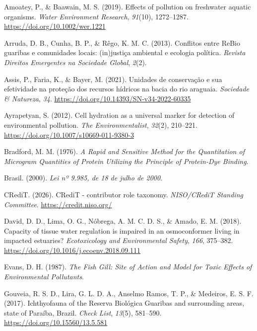 \documentclass[
  american,
  letterpaper,
  DIV=11,
  numbers=noendperiod]{scrartcl}
\newlength{\cslhangindent}
\newenvironment{CSLReferences}[2] %
 {\begin{list}{}{%
  \setlength{\itemindent}{0pt}
  \setlength{\leftmargin}{0pt}
  \setlength{\parsep}{0pt}
  \ifodd #1
   \setlength{\leftmargin}{\cslhangindent}
   \setlength{\itemindent}{-1\cslhangindent}
  \fi
  \setlength{\itemsep}{#2\baselineskip}}}
 {\end{list}}
\begin{document}
\label{refs}
\begin{CSLReferences}{1}{0}
Amoatey, P., \& Baawain, M. S. (2019). Effects of pollution on
freshwater aquatic organisms. \emph{Water Environment Research},
\emph{91}(10), 1272--1287. \url{https://doi.org/10.1002/wer.1221}

Arruda, D. B., Cunha, B. P., \& Rêgo, K. M. C. (2013). Conflitos entre
ReBio guaribas e comunidades locais: (in)justiça ambiental e ecologia
política. \emph{Revista Direitos Emergentes na Sociedade Global},
\emph{2}(2).

Assis, P., Faria, K., \& Bayer, M. (2021). Unidades de conservação e sua
efetividade na proteção dos recursos hídricos na bacia do rio araguaia.
\emph{Sociedade \& Natureza}, \emph{34}.
\url{https://doi.org/10.14393/SN-v34-2022-60335}

Ayrapetyan, S. (2012). Cell hydration as a universal marker for
detection of environmental pollution. \emph{The Environmentalist},
\emph{32}(2), 210--221. \url{https://doi.org/10.1007/s10669-011-9380-3}

Bradford, M. M. (1976). \emph{A Rapid and Sensitive Method for the
Quantitation of Microgram Quantities of Protein Utilizing the Principle
of Protein-Dye Binding}.

Brasil. (2000). \emph{Lei nº 9.985, de 18 de julho de 2000}.

CRediT. (2026). CRediT - contributor role taxonomy. \emph{NISO/CRediT
Standing Committee}. \url{https://credit.niso.org/}

David, D. D., Lima, O. G., Nóbrega, A. M. C. D. S., \& Amado, E. M.
(2018). Capacity of tissue water regulation is impaired in an
osmoconformer living in impacted estuaries? \emph{Ecotoxicology and
Environmental Safety}, \emph{166}, 375--382.
\url{https://doi.org/10.1016/j.ecoenv.2018.09.111}

Evans, D. H. (1987). \emph{The Fish Gill: Site of Action and Model for
Toxic Effects of Environmental Pollutants}.

Gouveia, R. S. D., Lira, G. L. D. A., Anselmo Ramos, T. P., \& Medeiros,
E. S. F. (2017). Ichthyofauna of the Reserva Biológica Guaribas and
surrounding areas, state of Paraíba, Brazil. \emph{Check List},
\emph{13}(5), 581--590. \url{https://doi.org/10.15560/13.5.581}


\end{CSLReferences}
\end{document}
